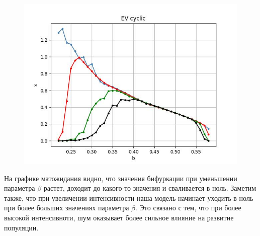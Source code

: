     \begin{figure}
        \centering
        \includegraphics[width=\textwidth]{stochastic/images/EV_cyclic.jpg}
        
        \captionsetup{justification=centering}
        \caption{}
        \label{EV_cyclic}
    \end{figure}

    На графике матожидания видно, что значения бифуркации при уменьшении параметра \(\beta\) растет, доходит до какого-то значения и сваливается в ноль. Заметим также, что при увеличении интенсивности наша модель начинает уходить в ноль при более больших значениях параметра \(\beta\). Это связано с тем, что при более высокой интенсивноти, шум оказывает более сильное влияние на развитие популяции.




